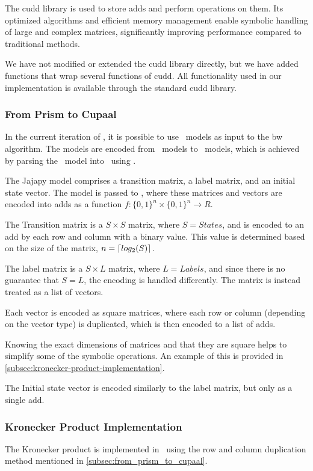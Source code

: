 The \gls{cudd} library is used to store \glspl{add} and perform operations on them.
Its optimized algorithms and efficient memory management enable symbolic handling of large and complex matrices, significantly improving performance compared to traditional methods.

We have not modified or extended the \gls{cudd} library directly, but we have added functions that wrap several functions of \gls{cudd}.
All functionality used in our implementation is available through the standard \gls{cudd} library.

\subsubsection{From Prism to Cupaal}\label{subsec:from_prism_to_cupaal}
In the current iteration of \Cupaal, it is possible to use \Prism\ models as input to the \gls{bw} algorithm. The models are encoded from \Prism\ models to \Cupaal\ models, which is achieved by parsing the \Prism\ model into \Jajapy\ using \Stormpy.

The Jajapy model comprises a transition matrix, a label matrix, and an initial state vector.
The model is passed to \Cupaal, where these matrices and vectors are encoded into \glspl{add} as a function $f \colon \{0,1\}^n \times \{0,1\}^n \to R$.

The Transition matrix is a $S\times S$ matrix, where $S=States$, and is encoded to an \gls{add} by each row and column with a binary value. This value is determined based on the size of the matrix,
$n = \left\lceil log_2(S) \right\rceil$.

The label matrix is a $S\times L$ matrix, where $L=Labels$, and since there is no guarantee that $S = L$, the encoding is handled differently.
The matrix is instead treated as a list of vectors.

Each vector is encoded as square matrices, where each row or column (depending on the vector type) is duplicated, which is then encoded to a list of \glspl{add}.

Knowing the exact dimensions of matrices and that they are square helps to simplify some of the symbolic operations.
An example of this is provided in \autoref{subsec:kronecker-product-implementation}.

The Initial state vector is encoded similarly to the label matrix, but only as a single \gls{add}.

\subsubsection{Kronecker Product Implementation}\label{subsec:kronecker-product-implementation}
The Kronecker product is implemented in \Cupaal\ using the row and column duplication method mentioned in \autoref{subsec:from_prism_to_cupaal}.

